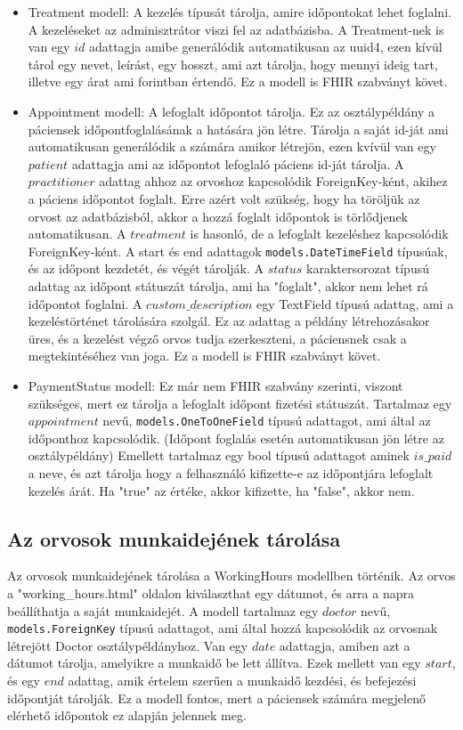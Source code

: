 \begin{itemize}
	\item Treatment modell: A kezelés típusát tárolja, amire időpontokat lehet foglalni. A kezeléseket az adminisztrátor viszi fel az adatbázisba. A Treatment-nek is van egy $id$ adattagja amibe generálódik automatikusan az uuid4, ezen kívül tárol egy nevet, leírást, egy hosszt, ami azt tárolja, hogy mennyi ideig tart, illetve egy árat ami forintban értendő. Ez a modell is FHIR szabványt követ.
	\item Appointment modell: A lefoglalt időpontot tárolja. Ez az osztálypéldány a páciensek időpontfoglalásának a hatására jön létre. Tárolja a saját id-ját ami automatikusan generálódik a számára amikor létrejön, ezen kvívül van egy $patient$ adattagja ami az időpontot lefoglaló páciens id-ját tárolja. A $practitioner$ adattag ahhoz az orvoshoz kapcsolódik ForeignKey-ként, akihez a páciens időpontot foglalt. Erre azért volt szükség, hogy ha töröljük az orvost az adatbázisból, akkor a hozzá foglalt időpontok is törlődjenek automatikusan. A $treatment$ is hasonló, de a lefoglalt kezeléshez kapcsolódik ForeignKey-ként. A start és end adattagok \texttt{models.DateTimeField} típusúak, és az időpont kezdetét, és végét tárolják. A $status$ karaktersorozat típusú adattag az időpont státuszát tárolja, ami ha "foglalt", akkor nem lehet rá időpontot foglalni. A $custom\_description$ egy TextField típusú adattag, ami a kezeléstörténet tárolására szolgál. Ez az adattag a példány létrehozásakor üres, és a kezelést végző orvos tudja szerkeszteni, a páciensnek csak a megtekintéséhez van joga. Ez a modell is FHIR szabványt követ.
	\item PaymentStatus modell: Ez már nem FHIR szabvány szerinti, viszont szükséges, mert ez tárolja a lefoglalt időpont fizetési státuszát. Tartalmaz egy $appointment$ nevű, \texttt{models.OneToOneField} típusú adattagot, ami által az időponthoz kapcsolódik. (Időpont foglalás esetén automatikusan jön létre az osztálypéldány) Emellett tartalmaz egy bool típusú adattagot aminek $is\_paid$ a neve, és azt tárolja hogy a felhasználó kifizette-e az időpontjára lefoglalt kezelés árát. Ha "true" az értéke, akkor kifizette, ha "false", akkor nem.
\end{itemize}

\subsection{Az orvosok munkaidejének tárolása}

Az orvosok munkaidejének tárolása a WorkingHours modellben történik. Az orvos a "working\_hours.html" oldalon kiválaszthat egy dátumot, és arra a napra beállíthatja a saját munkaidejét. A modell tartalmaz egy $doctor$ nevű, \texttt{models.ForeignKey} típusú adattagot, ami által hozzá kapcsolódik az orvosnak létrejött Doctor osztálypéldányhoz. Van egy $date$ adattagja, amiben azt a dátumot tárolja, amelyikre a munkaidő be lett állítva. Ezek mellett van egy $start$, és egy $end$ adattag, amik értelem szerűen a munkaidő kezdési, és befejezési időpontját tárolják. Ez a modell fontos, mert a páciensek számára megjelenő elérhető időpontok ez alapján jelennek meg.
